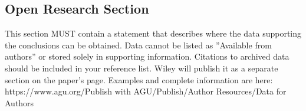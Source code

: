 \documentclass[draft]{agujournal2019}
\begin{document}
\begin{refsection}
%








%
%

\section*{Open Research Section}
This section MUST contain a statement that describes where the data supporting the conclusions can be obtained. Data cannot be listed as ''Available from authors'' or stored solely in supporting information. Citations to archived data should be included in your reference list. Wiley will publish it as a separate section on the paper’s page. Examples and complete information are here:
https://www.agu.org/Publish with AGU/Publish/Author Resources/Data for Authors


\end{refsection}
\end{document}

